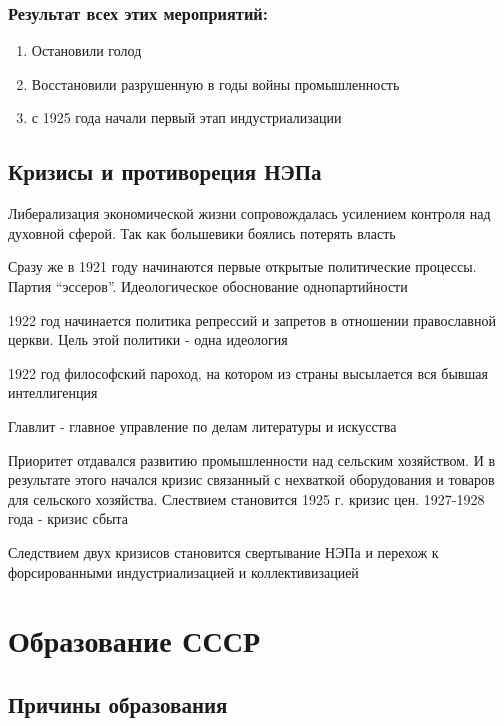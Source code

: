 \documentclass[a4paper]{article}
\begin{document}
\subsubsection{Результат всех этих мероприятий:}
\begin{enumerate}
    \item Остановили голод
    \item Восстановили разрушенную в годы войны промышленность
    \item с 1925 года начали первый этап индустриализации
\end{enumerate}

\subsection{Кризисы и противореция НЭПа}
Либерализация экономической жизни сопровождалась усилением контроля над духовной сферой. Так как большевики боялись потерять власть

Сразу же в 1921 году начинаются первые открытые политические процессы. Партия ``эссеров''. Идеологическое обоснование однопартийности

1922 год начинается политика репрессий и запретов в отношении православной церкви. Цель этой политики - одна идеология

1922 год философский пароход, на котором из страны высылается вся бывшая интеллигенция

Главлит - главное управление по делам литературы и искусства

Приоритет отдавался развитию промышленности над сельским хозяйством. И в результате этого начался кризис связанный с нехваткой оборудования и товаров для сельского хозяйства. Слествием становится 1925 г. кризис цен. 1927-1928 года - кризис сбыта

Следствием двух кризисов становится свертывание НЭПа и перехож к форсированными индустриализацией и коллективизацией

\section{Образование СССР}
\subsection{Причины образования}
\end{document}
